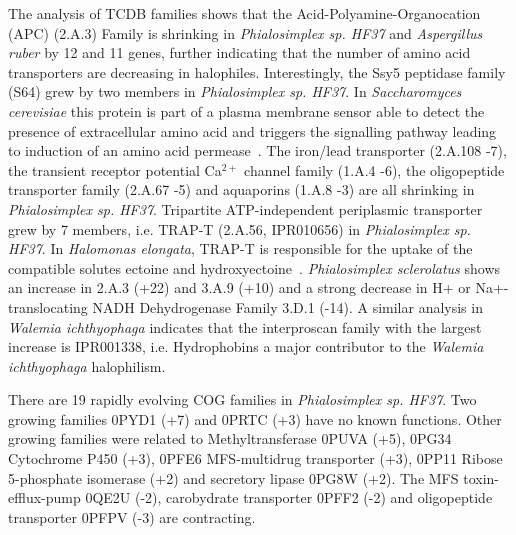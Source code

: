\documentclass[fontsize=10pt, paper=a4,fleqn, ]{wlscirep}
\newif\ifcode
\newcommand{\aspRub}{\textit{Aspergillus ruber}}
\newcommand{\walIch}{\textit{Walemia ichthyophaga}}
\newcommand{\sacCer}{\textit{Saccharomyces cerevisiae}}
\newcommand{\phiSp}{\textit{Phialosimplex sp. HF37}}
\newcommand{\phiScl}{\textit{Phialosimplex sclerolatus}}
\begin{document}
The analysis of TCDB families shows that the
Acid-Polyamine-Organocation (APC) (2.A.3) Family is shrinking in
{\phiSp} and {\aspRub} by 12 and 11 genes, further indicating that the
number of amino acid transporters are decreasing in
halophiles. Interestingly, the Ssy5 peptidase  family (S64) grew by
two members in {\phiSp}. In {\sacCer} this protein is part of a plasma
membrane sensor able to detect the presence of extracellular amino
acid and triggers the signalling pathway leading to induction of an
amino acid permease~\cite{abdel2004}. The iron/lead transporter
(2.A.108 -7), the transient receptor potential Ca$^{2+}$ channel
family (1.A.4 -6), the oligopeptide transporter family (2.A.67 -5) and
aquaporins (1.A.8 -3) are all shrinking in {\phiSp}. Tripartite
ATP-independent periplasmic transporter grew by 7 members, i.e. TRAP-T
(2.A.56, IPR010656) in {\phiSp}. In \textit{Halomonas   elongata},
TRAP-T  is responsible for the uptake of the compatible solutes
ectoine and hydroxyectoine~\cite{Grammann2002}. {\phiScl} shows an
increase in 2.A.3 (+22) and 3.A.9 (+10) and a strong decrease in H+ or
Na+-translocating NADH Dehydrogenase Family 3.D.1 (-14). A similar
analysis in {\walIch} indicates that the interproscan family with the
largest increase is IPR001338, i.e. Hydrophobins a major contributor
to the {\walIch} halophilism. 


\ifcode
\begin{listing}
  \mint[breaklines,bgcolor=black,formatcom=\color{white},fontsize=\footnotesize]{shell}{
    for i in aspRub canPar debFab debHan horWer penChr phiSp phiScl
    sacCer schPom walIch walMel; do printf $i"#####\n"; cat
    tcdbCAFE.csv.small.results.cafe.report_fams.txt | grep $i | grep
    -Po "[A-Z0-9:]+\[(\+|-)\d+\*\]" | sed -r 's/([\[|\]|\*])/ /g' |
    sort -k 2,2gr  | perl -lane 'if(abs($F[1])>0) {print;}' | perl
    -lane 'print; printf `grep  $F[0]
    /media/work/share/database/InterProscanDictionary.dat`' | paste -
    - | sort -k 2,2; done
\end{listing}
\fi

There are 19 rapidly evolving COG families in {\phiSp}. Two growing
families 0PYD1 (+7) and 0PRTC (+3) have no known functions. Other
growing families were related to Methyltransferase 0PUVA (+5), 0PG34
Cytochrome P450 (+3), 0PFE6 MFS-multidrug transporter (+3), 0PP11 Ribose
5-phosphate isomerase (+2) and secretory lipase 0PG8W (+2). The MFS
toxin-efflux-pump 0QE2U (-2), carobydrate transporter 0PFF2 (-2) and oligopeptide
transporter 0PFPV (-3) are contracting. 
\end{document}
